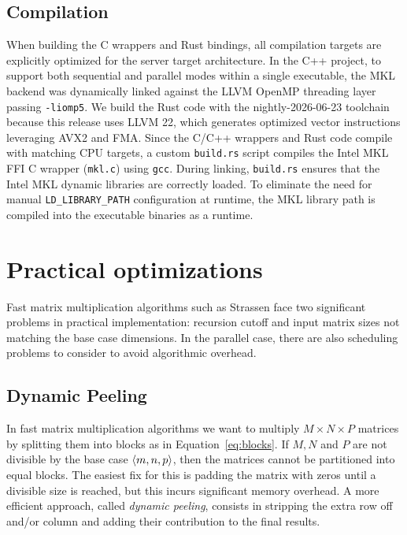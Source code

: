 \documentclass[a4paper, leqno, 11pt]{article}
\theoremstyle{definition}
\theoremstyle{remark}
\theoremstyle{experimental}
\begin{document}
\subsection*{Compilation}
When building the C wrappers and Rust bindings, all compilation targets are explicitly optimized for
the server target architecture. In the C++ project, to support both sequential and parallel modes
within a single executable, the MKL backend was dynamically linked against the LLVM OpenMP threading
layer passing \texttt{-liomp5}.
We build the Rust code with the nightly-2026-06-23 toolchain because this release uses LLVM 22, which
generates optimized vector instructions leveraging AVX2 and FMA. 
Since the C/C++ wrappers and Rust code compile with matching CPU targets, 
a custom \texttt{build.rs} script compiles the Intel MKL FFI C wrapper (\texttt{mkl.c}) using
\texttt{gcc}. During linking, \texttt{build.rs} ensures that the Intel MKL dynamic libraries are
correctly loaded. To eliminate the need for manual \texttt{LD\_LIBRARY\_PATH} configuration at
runtime, the MKL library path is compiled into the executable binaries as a runtime.

\section{Practical optimizations}
\label{sec:optimizations}

Fast matrix multiplication algorithms such as Strassen face two significant problems in practical
implementation: recursion cutoff and input matrix sizes not matching the base case dimensions. In
the parallel case, there are also scheduling problems to consider to avoid algorithmic overhead.

\subsection{Dynamic Peeling}
\label{sec:dynpeel}

In fast matrix multiplication algorithms we want to multiply $ M \times N\times P $ matrices by splitting them into blocks as
in Equation~\ref{eq:blocks}. If $ M,N $ and $ P $ are not divisible by the base case $ \angb{m,n,p} $, then the
matrices cannot be partitioned into equal blocks. The easiest fix for this is padding the matrix with zeros until a divisible size is
reached, but this incurs significant memory overhead. A more efficient approach, called \emph{dynamic
peeling}, consists in stripping the extra row off and/or column and adding their contribution to the
final results.
\end{document}
